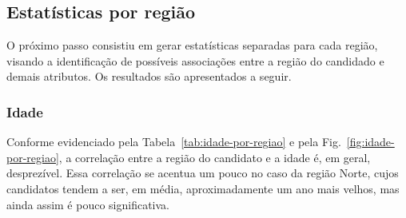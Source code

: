 \documentclass[12pt]{article}
\newcommand{\reffig}[1]{Fig.~\ref{fig:#1}}
\newcommand{\reftab}[1]{Tabela~\ref{tab:#1}}
\begin{document}
\iffalse
\subsection{Estatísticas por região}
O próximo passo consistiu em gerar estatísticas separadas para cada região, visando a identificação de possíveis associações entre a região do candidado e demais atributos.
Os resultados são apresentados a seguir.

\subsubsection{Idade}
Conforme evidenciado pela \reftab{idade-por-regiao} e pela \reffig{idade-por-regiao}, a correlação entre a região do candidato e a idade é, em geral, desprezível. Essa correlação se acentua um pouco no caso da região Norte, cujos candidatos tendem a ser, em média, aproximadamente um ano mais velhos, mas ainda assim é pouco significativa.
\end{document}
